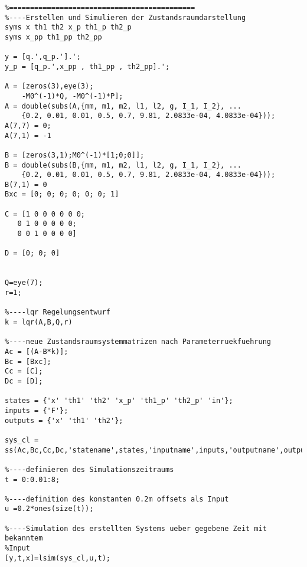 \documentclass[a4paper, 10pt]{report}
\begin{document}
\begin{lstlisting}
%============================================
%----Erstellen und Simulieren der Zustandsraumdarstellung
syms x th1 th2 x_p th1_p th2_p
syms x_pp th1_pp th2_pp

y = [q.',q_p.'].';
y_p = [q_p.',x_pp , th1_pp , th2_pp].';

A = [zeros(3),eye(3);
    -M0^(-1)*Q, -M0^(-1)*P];
A = double(subs(A,{mm, m1, m2, l1, l2, g, I_1, I_2}, ...
    {0.2, 0.01, 0.01, 0.5, 0.7, 9.81, 2.0833e-04, 4.0833e-04}));
A(7,7) = 0;
A(7,1) = -1

B = [zeros(3,1);M0^(-1)*[1;0;0]];
B = double(subs(B,{mm, m1, m2, l1, l2, g, I_1, I_2}, ...
    {0.2, 0.01, 0.01, 0.5, 0.7, 9.81, 2.0833e-04, 4.0833e-04}));
B(7,1) = 0
Bxc = [0; 0; 0; 0; 0; 0; 1]

C = [1 0 0 0 0 0 0;
   0 1 0 0 0 0 0;
   0 0 1 0 0 0 0]

D = [0; 0; 0]


Q=eye(7);
r=1;

%----lqr Regelungsentwurf
k = lqr(A,B,Q,r)

%----neue Zustandsraumsystemmatrizen nach Parameterruekfuehrung
Ac = [(A-B*k)];
Bc = [Bxc];
Cc = [C];
Dc = [D];

states = {'x' 'th1' 'th2' 'x_p' 'th1_p' 'th2_p' 'in'};
inputs = {'F'};
outputs = {'x' 'th1' 'th2'};

sys_cl = ss(Ac,Bc,Cc,Dc,'statename',states,'inputname',inputs,'outputname',outputs);

%----definieren des Simulationszeitraums
t = 0:0.01:8;

%----definition des konstanten 0.2m offsets als Input
u =0.2*ones(size(t));

%----Simulation des erstellten Systems ueber gegebene Zeit mit bekanntem
%Input
[y,t,x]=lsim(sys_cl,u,t);

\end{lstlisting}
\end{document}
